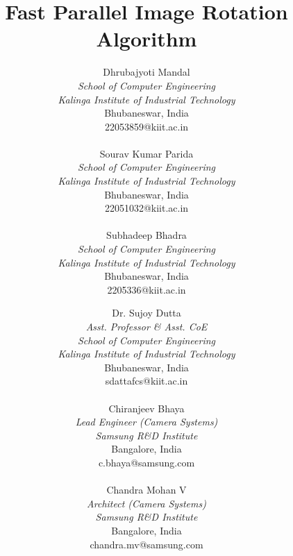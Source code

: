 \documentclass[conference]{IEEEtran}
\begin{document}
\title{Fast Parallel Image Rotation Algorithm}
\author {
    Dhrubajyoti Mandal \\
    \textit{School of Computer Engineering} \\
    \textit{Kalinga Institute of Industrial Technology} \\
    Bhubaneswar, India \\
    22053859@kiit.ac.in \\ \\ 
    Sourav Kumar Parida \\
    \textit{School of Computer Engineering} \\
    \textit{Kalinga Institute of Industrial Technology} \\
    Bhubaneswar, India \\ 
    22051032@kiit.ac.in \\ \\ 
    Subhadeep Bhadra \\ 
    \textit{School of Computer Engineering} \\ 
    \textit{Kalinga Institute of Industrial Technology} \\ 
    Bhubaneswar, India \\ 
    2205336@kiit.ac.in 
    \and 
    Dr. Sujoy Dutta \\ 
    \textit{Asst. Professor \& Asst. CoE} \\ 
    \textit{School of Computer Engineering} \\ 
    \textit{Kalinga Institute of Industrial Technology} \\ 
    Bhubaneswar, India \\ 
    sdattafcs@kiit.ac.in \\ \\ 
    Chiranjeev Bhaya \\ 
    \textit{Lead Engineer (Camera Systems)} \\ 
    \textit{Samsung R\&D Institute} \\ 
    Bangalore, India \\ 
    c.bhaya@samsung.com \\ \\ 
    Chandra Mohan V \\ 
    \textit{Architect (Camera Systems)} \\ 
    \textit{Samsung R\&D Institute} \\ 
    Bangalore, India \\ 
    chandra.mv@samsung.com 
}
\end{document}

